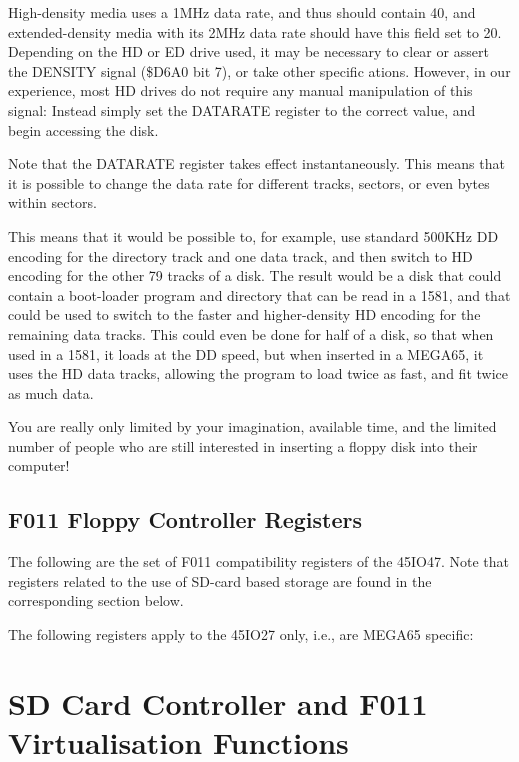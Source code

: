 High-density media uses a 1MHz data rate, and thus should contain 40,
and extended-density media with its 2MHz data rate should have this
field set to 20.  Depending on the HD or ED drive used, it may be
necessary to clear or assert the DENSITY signal (\$D6A0 bit 7), or
take other specific ations.  However, in our experience, most HD
drives do not require any manual manipulation of this signal: Instead
simply set the DATARATE register to the correct value, and begin
accessing the disk.

Note that the DATARATE register takes effect instantaneously.  This
means that it is possible to change the data rate for different
tracks, sectors, or even bytes within sectors.

This means that it
would be possible to, for example, use standard 500KHz DD encoding for
the directory track and one data track, and then switch to HD encoding for the other 79
tracks of a disk. The result would be a disk that could contain a
boot-loader program and directory that can be read in a 1581, and
that could be used to switch to the faster and higher-density HD
encoding for the remaining data tracks.  This could even be done for
half of a disk, so that when used in a 1581, it loads at the DD speed,
but when inserted in a MEGA65, it uses the HD data tracks, allowing
the program to load twice as fast, and fit twice as much data.

You are really only limited by your imagination, available time, and
the limited number of people who are still interested in inserting a
floppy disk into their computer!

\subsection{F011 Floppy Controller Registers}

The following are the set of F011 compatibility registers of the 45IO47.
Note that registers related to the use of SD-card based storage are found in the corresponding section below.



The following registers apply to the 45IO27 only, i.e., are MEGA65 specific:



\section{SD Card Controller and F011 Virtualisation Functions}

